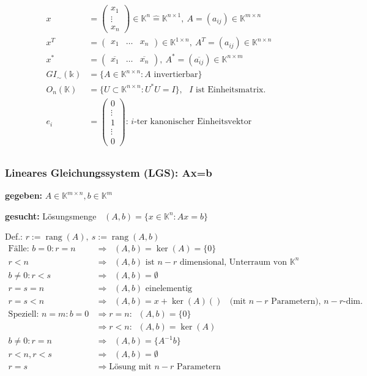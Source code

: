 \documentclass[a4paper]{scrartcl}
\newcommand{\rang}{\mathop{\mathrm{rang}}}
\newcommand{\loes}{\mathop{\mathrm{L\ddot{o}s}}}
\begin{document}
\begin{align*}
x &= \begin{pmatrix} x_1 \\ \vdots \\ x_n \end{pmatrix} 
\in \mathbb{K}^n \widehat{=} \mathbb{K}^{n \times 1},  
~ A=(a_{ij}) \in \mathbb{K}^{m \times n}  \\
x^T &= \begin{pmatrix} x_1 & \dots & x_n \end{pmatrix} 
\in \mathbb{K}^{1 \times n}, ~A^T = (a_{ij}) \in \mathbb{K}^{n \times n}  \\ 
x^{\ast} &= \begin{pmatrix}\overline{x_1} & \dots & \overline{x_n} \end{pmatrix}, 
~A^{\ast} = (\overline{a_{ij}}) \in \mathbb{K}^{n \times m}  \\
GI_{\sim} (\mathbb{k}) &= \{A \in \mathbb{K}^{n \times n}: A 
\text{ invertierbar} \}  \\
O_n (\mathbb{K})&= \{ U \subset \mathbb{K}^{n \times n}: 
U^{\ast} U = I \} , \text{ $I$ ist Einheitsmatrix.} \\
e_i &= \begin{pmatrix} 0 \\ \vdots \\ 1 \\ \vdots \\ 0 \end{pmatrix} 
\text{: $i$-ter kanonischer Einheitsvektor } \\
\end{align*}

\subsubsection*{Lineares Gleichungssystem (LGS): Ax=b}


\textbf{gegeben:} $A \in \mathbb{K}^{m \times n}, b \in \mathbb{K}^m$

\textbf{gesucht:} Lösungsmenge $\loes(A,b) = \{x \in \mathbb{K}^n : Ax=b\} $


Def.: $r:=\rang(A), ~ s := \rang(A,b)$
\begin{align*}
\text{Fälle: } b =0 : r = n &\Rightarrow \loes (A,b)= \ker(A)=\{0\}\\
r<n &\Rightarrow \loes (A,b) \text{ ist $n-r$ dimensional, Unterraum 
von } \mathbb{K}^n \\
b \neq 0: r<s &\Rightarrow \loes (A,b) = \emptyset \\
r=s=n &\Rightarrow \loes (A,b) \text{ einelementig }\\
r=s<n &\Rightarrow \loes (A,b) = x + \ker(A) () \loes  
\text{ (mit $n-r$ Parametern), $n-r$-dim. } \\
\text{Speziell: } n=m: b=0 &\Rightarrow r=n :  \loes (A,b) = \{0\}\\
&\Rightarrow r<n : \loes (A,b) = \ker(A)\\
b \neq 0: r=n &\Rightarrow \loes (A,b) = \{A^{-1}b\}\\ 
	r<n, r<s &\Rightarrow \loes (A,b) = \emptyset \\
	 r=s &\Rightarrow \text{Lösung mit $n-r$ Parametern}
\end{align*} 
\end{document}
